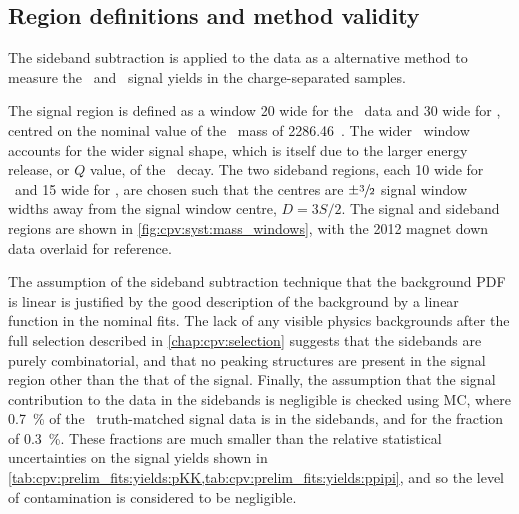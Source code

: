 \subsection{Region definitions and method validity}
\label{chap:cpv:syst:fit:defs}

The sideband subtraction is applied to the data as a alternative method to 
measure the \pKK\ and \ppipi\ signal yields in the charge-separated samples.

The signal region is defined as a window \SI{20}{\MeVcc} wide for the \pKK\ 
data and \SI{30}{\MeVcc} wide for \ppipi, centred on the nominal value of the 
\PLambdac\ mass of \SI{2286.46}{\MeVcc}~\cite{PDG2014}.
The wider \ppipi\ window accounts for the wider signal shape, which is itself 
due to the larger energy release, or $Q$ value, of the \ppipi\ decay.
The two sideband regions, each \SI{10}{\MeVcc} wide for \pKK\ and 
\SI{15}{\MeVcc} wide for \ppipi, are chosen such that the centres are 
$\pm\sfrac{3}{2}$ signal window widths away from the signal window centre, $D = 
3S/2$.
The signal and sideband regions are shown in \cref{fig:cpv:syst:mass_windows}, 
with the 2012 magnet down data overlaid for reference.

The assumption of the sideband subtraction technique that the background 
\ac{PDF} is linear is justified by the good description of the background by a 
linear function in the nominal fits.
The lack of any visible physics backgrounds after the full selection described 
in \cref{chap:cpv:selection} suggests that the sidebands are purely 
combinatorial, and that no peaking structures are present in the signal region 
other than the that of the signal.
Finally, the assumption that the signal contribution to the data in the 
sidebands is negligible is checked using \ac{MC}, where \SI{0.7}{\percent} of 
the \ppipi\ truth-matched signal data is in the sidebands, and for \pKK the 
fraction of \SI{0.3}{\percent}.
These fractions are much smaller than the relative statistical uncertainties on 
the signal yields shown in 
\cref{tab:cpv:prelim_fits:yields:pKK,tab:cpv:prelim_fits:yields:ppipi}, and so 
the level of contamination is considered to be negligible.

